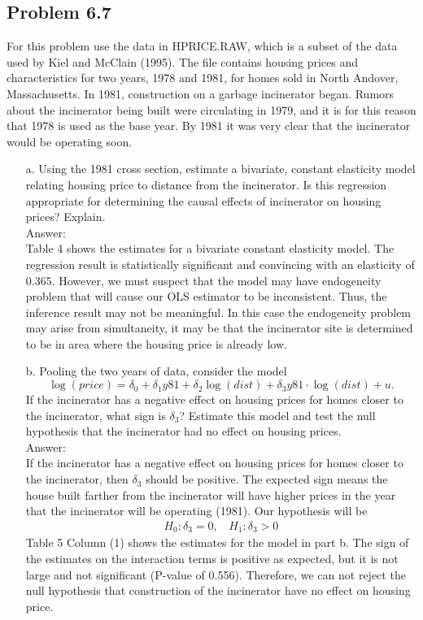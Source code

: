 \documentclass[10pt]{article}
\begin{document}
\subsection*{Problem 6.7}
For this problem use the data in HPRICE.RAW, which is a subset of the data used by Kiel and McClain (1995). The file contains housing prices and characteristics for two years, 1978 and 1981, for homes sold in North Andover, Massachusetts. In 1981, construction on a garbage incinerator began. Rumors about the incinerator being built were circulating in 1979, and it is for this reason that 1978 is used as the base year. By 1981 it was very clear that the incinerator would be operating soon.
\begin{enumerate}
\item[a.] Using the 1981 cross section, estimate a bivariate, constant elasticity model relating housing price to distance from the incinerator. Is this regression appropriate for determining the causal effects of incinerator on housing prices? Explain.
\\ Answer: \\
Table 4 shows the estimates for a bivariate constant elasticity model. The regression result is statistically significant and convincing with an elasticity of 0.365. However, we must suspect that the model may have endogeneity problem that will cause our OLS estimator to be inconsistent. Thus, the inference result may not be meaningful. In this case the endogeneity problem may arise from simultaneity, it may be that the incinerator site is determined to be in area where the housing price is already low.


\item[b.] Pooling the two years of data, consider the model
\[\log(price)=\delta_0+\delta_1y81+\delta_2\log(dist)+\delta_3y81\cdot \log(dist)+u.\]
If the incinerator has a negative effect on housing prices for homes closer to the incinerator, what sign is $\delta_3$? Estimate this model and test the null hypothesis that the incinerator had no effect on housing prices. 
\\ Answer:\\
If the incinerator has a negative effect on housing prices for homes closer to the incinerator, then $\delta_3$ should be positive. The expected sign means the house built farther from the incinerator will have higher prices in the year that the incinerator will be operating (1981). Our hypothesis will be
\begin{align*}
    H_0: \delta_3=0, \ \ \ \ H_1: \delta_3>0
\end{align*}
Table 5 Column (1) shows the estimates for the model in part b. The sign of the estimates on the interaction terms is positive as expected, but it is not large and not significant (P-value of 0.556). Therefore, we can not reject the null hypothesis that construction of the incinerator have no effect on housing price.



\end{enumerate}
\end{document}
